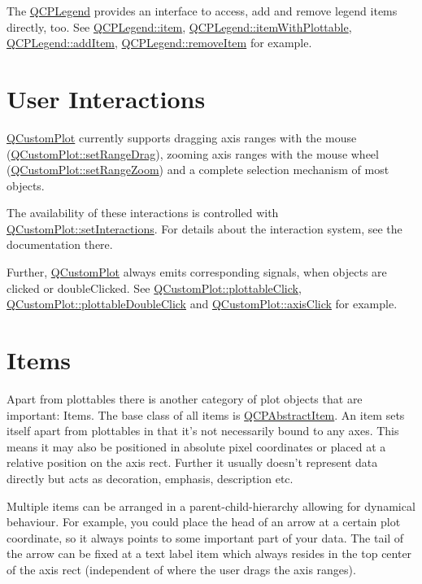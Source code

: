 The \hyperlink{a00045}{Q\+C\+P\+Legend} provides an interface to access, add and remove legend items directly, too. See \hyperlink{a00045_a454272d7094437beb3278a2294006da5}{Q\+C\+P\+Legend\+::item}, \hyperlink{a00045_a5ee80cf83f65e3b6dd386942ee3cc1ee}{Q\+C\+P\+Legend\+::item\+With\+Plottable}, \hyperlink{a00045_a3ab274de52d2951faea45a6d975e6b3f}{Q\+C\+P\+Legend\+::add\+Item}, \hyperlink{a00045_ac91595c3eaa746fe6321d2eb952c63bb}{Q\+C\+P\+Legend\+::remove\+Item} for example.\hypertarget{index_userinteraction}{}\section{User Interactions}\label{index_userinteraction}
\hyperlink{a00030_d8/d00/a00186}{Q\+Custom\+Plot} currently supports dragging axis ranges with the mouse (\hyperlink{a00116_aa0e1c44295da2706d0f12ad48f64b806}{Q\+Custom\+Plot\+::set\+Range\+Drag}), zooming axis ranges with the mouse wheel (\hyperlink{a00116_ad4a0919e471549a2daea517ce6538ad8}{Q\+Custom\+Plot\+::set\+Range\+Zoom}) and a complete selection mechanism of most objects.

The availability of these interactions is controlled with \hyperlink{a00116_add9cc886ff5257f64fb4117cf6c135fe}{Q\+Custom\+Plot\+::set\+Interactions}. For details about the interaction system, see the documentation there.

Further, \hyperlink{a00030_d8/d00/a00186}{Q\+Custom\+Plot} always emits corresponding signals, when objects are clicked or double\+Clicked. See \hyperlink{a00116_a57e5efa8a854620e9bf62d31fc139f53}{Q\+Custom\+Plot\+::plottable\+Click}, \hyperlink{a00116_af2e6f1cea923dae437681d01ce7d0c31}{Q\+Custom\+Plot\+::plottable\+Double\+Click} and \hyperlink{a00116_abf635f8b56ab5c16d5de9f358543e82b}{Q\+Custom\+Plot\+::axis\+Click} for example.\hypertarget{index_items}{}\section{Items}\label{index_items}
Apart from plottables there is another category of plot objects that are important\+: Items. The base class of all items is \hyperlink{a00022}{Q\+C\+P\+Abstract\+Item}. An item sets itself apart from plottables in that it's not necessarily bound to any axes. This means it may also be positioned in absolute pixel coordinates or placed at a relative position on the axis rect. Further it usually doesn't represent data directly but acts as decoration, emphasis, description etc.

Multiple items can be arranged in a parent-\/child-\/hierarchy allowing for dynamical behaviour. For example, you could place the head of an arrow at a certain plot coordinate, so it always points to some important part of your data. The tail of the arrow can be fixed at a text label item which always resides in the top center of the axis rect (independent of where the user drags the axis ranges).

